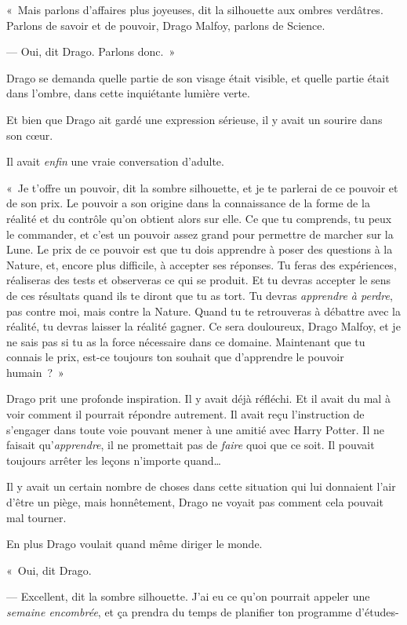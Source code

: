 «~Mais parlons d'affaires plus joyeuses, dit la silhouette aux ombres verdâtres.
Parlons de savoir et de pouvoir, Drago Malfoy, parlons de Science.

--- Oui, dit Drago.
Parlons donc.~»

Drago se demanda quelle partie de son visage était visible, et quelle partie était dans l'ombre, dans cette inquiétante lumière verte.

Et bien que Drago ait gardé une expression sérieuse, il y avait un sourire dans son cœur.

Il avait \emph{enfin} une vraie conversation d'adulte.

«~Je t'offre un pouvoir, dit la sombre silhouette, et je te parlerai de ce pouvoir et de son prix.
Le pouvoir a son origine dans la connaissance de la forme de la réalité et du contrôle qu'on obtient alors sur elle.
Ce que tu comprends, tu peux le commander, et c'est un pouvoir assez grand pour permettre de marcher sur la Lune.
Le prix de ce pouvoir est que tu dois apprendre à poser des questions à la Nature, et, encore plus difficile, à accepter ses réponses.
Tu feras des expériences, réaliseras des tests et observeras ce qui se produit.
Et tu devras accepter le sens de ces résultats quand ils te diront que tu as tort.
Tu devras \emph{apprendre à perdre}, pas contre moi, mais contre la Nature.
Quand tu te retrouveras à débattre avec la réalité, tu devras laisser la réalité gagner.
Ce sera douloureux, Drago Malfoy, et je ne sais pas si tu as la force nécessaire dans ce domaine.
Maintenant que tu connais le prix, est-ce toujours ton souhait que d'apprendre le pouvoir humain~?~»

Drago prit une profonde inspiration.
Il y avait déjà réfléchi.
Et il avait du mal à voir comment il pourrait répondre autrement.
Il avait reçu l'instruction de s'engager dans toute voie pouvant mener à une amitié avec Harry Potter.
Il ne faisait qu'\emph{apprendre}, il ne promettait pas de \emph{faire} quoi que ce soit.
Il pouvait toujours arrêter les leçons n'importe quand…

Il y avait un certain nombre de choses dans cette situation qui lui donnaient l'air d'être un piège, mais honnêtement, Drago ne voyait pas comment cela pouvait mal tourner.

En plus Drago voulait quand même diriger le monde.

«~Oui, dit Drago.

--- Excellent, dit la sombre silhouette.
J'ai eu ce qu'on pourrait appeler une \emph{semaine encombrée}, et ça prendra du temps de planifier ton programme d'études-

